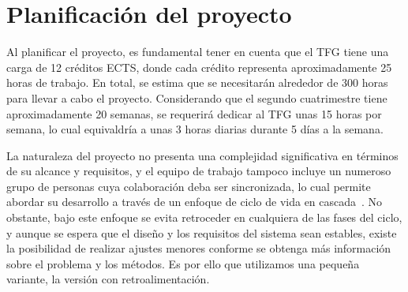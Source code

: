 \section{Planificación del proyecto}
Al planificar el proyecto, es fundamental tener en cuenta que el TFG 
tiene una carga de 12 créditos ECTS, donde cada 
crédito representa aproximadamente 25 horas de trabajo. 
En total, se estima que se necesitarán alrededor de 300 horas para llevar a cabo 
el proyecto. Considerando que el segundo cuatrimestre tiene aproximadamente 20 semanas, 
se requerirá dedicar al TFG unas 15 horas por semana, lo cual equivaldría a unas 3 horas 
diarias durante 5 días a la semana.
 
La naturaleza del proyecto no presenta una complejidad significativa en términos 
de su alcance y requisitos, y el equipo de trabajo tampoco incluye un numeroso grupo 
de personas cuya colaboración deba ser sincronizada, lo cual permite abordar su desarrollo a través de un 
enfoque de ciclo de vida en cascada~\cite{ModeloEnCascada}. 
No obstante, bajo este enfoque se evita retroceder en cualquiera de las fases 
del ciclo, y aunque se espera que el diseño y los requisitos del sistema sean 
estables, existe la posibilidad de realizar ajustes menores conforme se obtenga
más información sobre el problema y los métodos. 
Es por ello que utilizamos una pequeña variante, la versión con retroalimentación.
 
